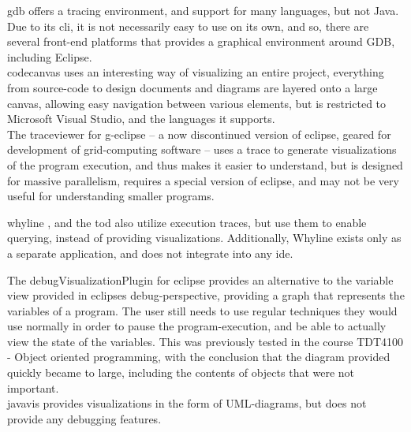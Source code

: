 \gls{gdb} offers a tracing environment, and support for many languages, but not Java.
Due to its \gls{cli}, it is not necessarily easy to use on its own, and so, there are several front-end platforms that provides a graphical environment around GDB, including Eclipse.
~\\

\Gls{codecanvas} uses an interesting way of visualizing an entire project, everything from source-code to design documents and diagrams are layered onto a large canvas, allowing easy navigation between various elements, but is restricted to Microsoft Visual Studio, and the languages it supports.
~\\

The \gls{traceviewer} \cite{Kranzlmuller} for g-eclipse -- a now discontinued version of eclipse, geared for development of grid-computing software -- uses a trace to generate visualizations of the program execution, and thus makes it easier to understand, but is designed for massive parallelism, requires a special version of eclipse, and may not be very useful for understanding smaller programs.
~\\

\begin{sloppypar}
\Gls{whyline} \cite{ko2009}, and the \gls{tod} \cite{Pothier2007} also utilize execution traces, but use them to enable querying, instead of providing visualizations.
Additionally, Whyline exists only as a separate application, and does not integrate into any \gls{ide}.
~\\
\end{sloppypar}

The \gls{debugVisualizationPlugin} for eclipse provides an alternative to the variable view provided in eclipses debug-perspective, providing a graph that represents the variables of a program.
The user still needs to use regular techniques they would use normally in order to pause the program-execution, and be able to actually view the state of the variables.
This was previously tested in the course TDT4100 - Object oriented programming, with the conclusion that the diagram provided quickly became to large, including the contents of objects that were not important.
~\\

\Gls{javavis} \cite{Oechsle2002} provides visualizations in the form of UML-diagrams, but does not provide any debugging features.
~\\

